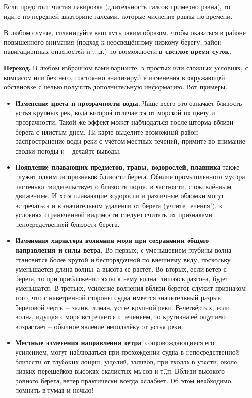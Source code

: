 Если предстоит чистая лавировка (длительность галсов примерно равна), то идите по передней шкаторине галсами, которые численно равны по времени.

В любом случае, спланируйте ваш путь таким образом, чтобы оказаться в районе повышенного внимания (подход к неосвещённому низкому берегу, район навигационных опасностей и т.\=,д.) по возможности \textbf{в светлое время суток.} 

\textbf{Переход.} В любом избранном вами варианте, в простых или сложных условиях, с компасом или без него, постоянно анализируйте изменения в окружающей обстановке с целью получить дополнительную информацию. Вот примеры:

\begin{itemize} 
\item \textbf{Изменение цвета и прозрачности воды.} Чаще всего это означает близость устья крупных рек, вода которой отличается от морской по цвету и прозрачности. Такой же эффект может наблюдаться после шторма вблизи берега с илистым дном. На карте выделите возможный район распространение воды реки с учётом местных течений, примите во внимание сводки погоды и \--- делайте выводы. 
\item \textbf{Появление плавающих предметов, травы, водорослей, плавника} также служит одним из признаков близости берега. Обилие промышленного мусора частенько свидетельствует о близости порта, в частности, с оживлённым движением. И хотя плавающие водоросли и различные обломки могут встречаться и в значительном удалении от берега (учтите течения!), в условиях ограниченной видимости следует считать их признаками непосредственной близости берега. 
\item \textbf{Изменение характера волнения моря при сохранении общего направления и силы ветра.} Во-первых, с уменьшением глубины волна становится более крутой и беспорядочной по внешнему виду, поскольку уменьшается длина волны, а высота ее растет. Во-вторых, если ветер с берега, то при приближении яхты к нему волна, лишаясь разгона, будет уменьшатся. В-третьих, усиление волнения вблизи берегов служит признаком того, что с наветренной стороны судна имеется значительный разрыв береговой черты \--- залив, лиман, устье крупной реки. В-четвёртых, если волна, идущая с моря встречается с течением, то крутизна её ощутимо возрастает \--- обычное явление неподалёку от устья реки. 
\item \textbf{Местные изменения направления ветра}, сопровождающиеся его усилением, могут наблюдаться при прохождении судна в непосредственной близости от глубоких лощин, ущелий, заливов, при входах в узости, около низких перешейков высоких скалистых мысов и т.\=,п. Вблизи высокого ровного берега, ветер практически всегда ослабнет. Об этом необходимо помнить в туман и ночью! 

\end{itemize}
